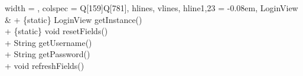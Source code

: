 \begin{longtblr}[
    label = none,
    entry = none,
  ]{
    width = \linewidth,
    colspec = {Q[159]Q[781]},
    hlines,
    vlines,
    hline{1,23} = {-}{0.08em},
  }
  LoginView              & {+ \{static\} LoginView getInstance()\\+ \{static\} void resetFields()\\+ String getUsername()\\+ String getPassword()\\+ void refreshFields()}                                                                                                                                                                                                                                                                                                                                                                                                                                                                                                                                                                                                                                                                                                                                                                                                                                                                                                                                                                                                                                                                                                                                                                                                                                                                                                                                                                                                                                                                                                                                                                                                                                                                                                                                                 \\

\end{longtblr}
